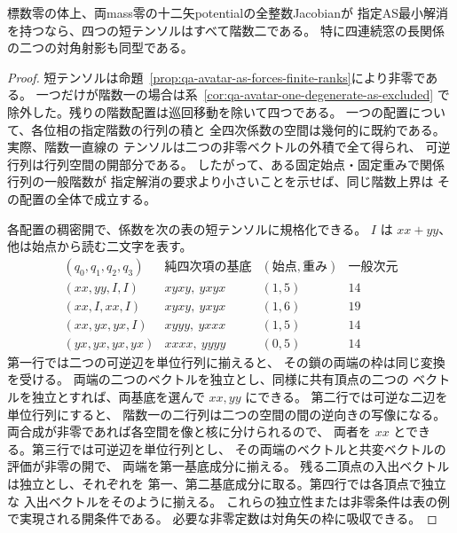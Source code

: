 \begin{theorem}[両mass零における短テンソルの非退化性]
\label{thm:qa-avatar-zero-mass-forces-short-rank}
標数零の体上、両mass零の十二矢potentialの全整数Jacobianが
指定AS最小解消を持つなら、四つの短テンソルはすべて階数二である。
特に四連続窓の長関係の二つの対角射影も同型である。
\end{theorem}
\begin{proof}
短テンソルは命題~\ref{prop:qa-avatar-as-forces-finite-ranks}により非零である。
一つだけが階数一の場合は系~\ref{cor:qa-avatar-one-degenerate-as-excluded}
で除外した。残りの階数配置は巡回移動を除いて四つである。
一つの配置について、各位相の指定階数の行列の積と
全四次係数の空間は幾何的に既約である。実際、階数一直線の
テンソルは二つの非零ベクトルの外積で全て得られ、
可逆行列は行列空間の開部分である。
したがって、ある固定始点・固定重みで関係行列の一般階数が
指定解消の要求より小さいことを示せば、同じ階数上界は
その配置の全体で成立する。

各配置の稠密開で、係数を次の表の短テンソルに規格化できる。
$I$ は $xx+yy$、他は始点から読む二文字を表す。
\[
\begin{array}{c|c|c|c}
(q_0,q_1,q_2,q_3)&\text{純四次項の基底}&(\text{始点},\text{重み})&
\text{一般次元}\\\hline
(xx,yy,I,I)&xyxy,\ yxyx&(1,5)&14\\
(xx,I,xx,I)&xyxy,\ yxyx&(1,6)&19\\
(xx,yx,yx,I)&xyyy,\ yxxx&(1,5)&14\\
(yx,yx,yx,yx)&xxxx,\ yyyy&(0,5)&14
\end{array}
\]
第一行では二つの可逆辺を単位行列に揃えると、
その鎖の両端の枠は同じ変換を受ける。
両端の二つのベクトルを独立とし、同様に共有頂点の二つの
ベクトルを独立とすれば、両基底を選んで $xx,yy$ にできる。
第二行では可逆な二辺を単位行列にすると、
階数一の二行列は二つの空間の間の逆向きの写像になる。
両合成が非零であれば各空間を像と核に分けられるので、
両者を $xx$ とできる。第三行では可逆辺を単位行列とし、
その両端のベクトルと共変ベクトルの評価が非零の開で、
両端を第一基底成分に揃える。
残る二頂点の入出ベクトルは独立とし、それぞれを
第一、第二基底成分に取る。第四行では各頂点で独立な
入出ベクトルをそのように揃える。
これらの独立性または非零条件は表の例で実現される開条件である。
必要な非零定数は対角矢の枠に吸収できる。


\end{proof}
